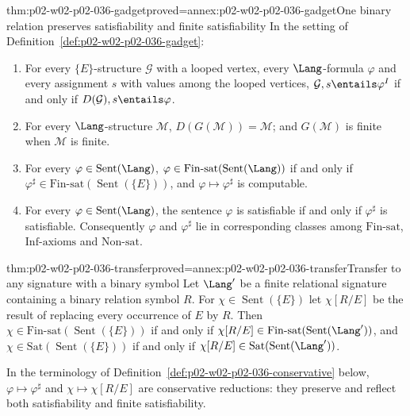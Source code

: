 \begin{hblemma}{thm:p02-w02-p02-036-gadget}{proved=annex:p02-w02-p02-036-gadget}{One binary relation preserves satisfiability and finite satisfiability}
In the setting of Definition~\ref{def:p02-w02-p02-036-gadget}:
\begin{enumerate}
\item For every \(\{E\}\)-structure \(\mathcal G\) with a looped vertex, every
      \(\Lang\)-formula \(\varphi\) and every assignment \(s\) with values
      among the looped vertices,
      \(\mathcal G,s\entails\varphi^{I}\) if and only if
      \(D(\mathcal G),s\entails\varphi\).
\item For every \(\Lang\)-structure \(\mathcal M\), \(D(G(\mathcal M))=\mathcal M\);
      and \(G(\mathcal M)\) is finite when \(\mathcal M\) is finite.
\item For every \(\varphi\in\operatorname{Sent}(\Lang)\),
      \(\varphi\in\mathrm{Fin\text{-}sat}(\operatorname{Sent}(\Lang))\) if and
      only if \(\varphi^{\sharp}\in\mathrm{Fin\text{-}sat}
      (\operatorname{Sent}(\{E\}))\), and \(\varphi\mapsto\varphi^{\sharp}\) is
      computable.
\item For every \(\varphi\in\operatorname{Sent}(\Lang)\), the sentence
      \(\varphi\) is satisfiable if and only if \(\varphi^{\sharp}\) is
      satisfiable.  Consequently \(\varphi\) and \(\varphi^{\sharp}\) lie in corresponding
      classes among \(\mathrm{Fin\text{-}sat}\), \(\mathrm{Inf\text{-}axioms}\)
      and \(\mathrm{Non\text{-}sat}\).
\end{enumerate}
\end{hblemma}

\begin{hblemma}{thm:p02-w02-p02-036-transfer}{proved=annex:p02-w02-p02-036-transfer}{Transfer to any signature with a binary symbol}
Let \(\Lang'\) be a finite relational signature containing a binary relation
symbol \(R\).  For \(\chi\in\operatorname{Sent}(\{E\})\) let \(\chi[R/E]\) be
the result of replacing every occurrence of \(E\) by \(R\).  Then
\(\chi\in\mathrm{Fin\text{-}sat}(\operatorname{Sent}(\{E\}))\) if and only if
\(\chi[R/E]\in\mathrm{Fin\text{-}sat}(\operatorname{Sent}(\Lang'))\), and
\(\chi\in\mathrm{Sat}(\operatorname{Sent}(\{E\}))\) if and only if
\(\chi[R/E]\in\mathrm{Sat}(\operatorname{Sent}(\Lang'))\).
\end{hblemma}

In the terminology of Definition~\ref{def:p02-w02-p02-036-conservative}
below, \(\varphi\mapsto\varphi^{\sharp}\) and \(\chi\mapsto\chi[R/E]\) are
conservative reductions: they preserve and reflect both satisfiability and
finite satisfiability.

